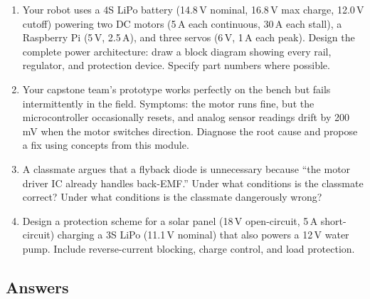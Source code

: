 \documentclass[11pt,letterpaper,twoside,openany]{book}
\begin{document}
\begin{enumerate}[resume,leftmargin=1.5em]
  \item Your robot uses a 4S LiPo battery (14.8\,V nominal, 16.8\,V max charge, 12.0\,V cutoff) powering two DC motors (5\,A each continuous, 30\,A each stall), a Raspberry Pi (5\,V, 2.5\,A), and three servos (6\,V, 1\,A each peak). Design the complete power architecture: draw a block diagram showing every rail, regulator, and protection device. Specify part numbers where possible.

  \item Your capstone team's prototype works perfectly on the bench but fails intermittently in the field. Symptoms: the motor runs fine, but the microcontroller occasionally resets, and analog sensor readings drift by 200\,mV when the motor switches direction. Diagnose the root cause and propose a fix using concepts from this module.

  \item A classmate argues that a flyback diode is unnecessary because ``the motor driver IC already handles back-EMF.'' Under what conditions is the classmate correct? Under what conditions is the classmate dangerously wrong?

  \item Design a protection scheme for a solar panel (18\,V open-circuit, 5\,A short-circuit) charging a 3S LiPo (11.1\,V nominal) that also powers a 12\,V water pump. Include reverse-current blocking, charge control, and load protection.
\end{enumerate}

\subsection{Answers}
\end{document}
